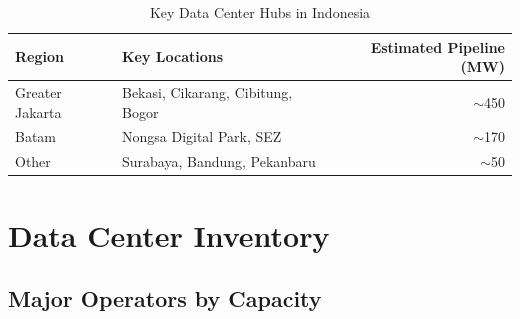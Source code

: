 \documentclass[11pt,a4paper]{article}
\begin{document}
\begin{table}[H]
\centering
\caption{Key Data Center Hubs in Indonesia}
\begin{tabular}{llr}
\toprule
\textbf{Region} & \textbf{Key Locations} & \textbf{Estimated Pipeline (MW)} \\
\midrule
Greater Jakarta & Bekasi, Cikarang, Cibitung, Bogor & $\sim$450 \\
Batam           & Nongsa Digital Park, SEZ           & $\sim$170 \\
Other           & Surabaya, Bandung, Pekanbaru       & $\sim$50 \\
\bottomrule
\end{tabular}
\end{table}

\section{Data Center Inventory}

\subsection{Major Operators by Capacity}
\end{document}
